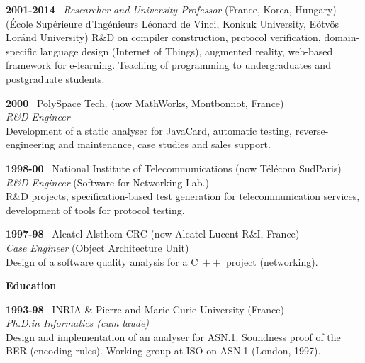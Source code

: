 \documentclass[a4paper,11pt]{article}
\newcommand{\cpp}{\mbox{C \hspace*{-2.5mm} \raise 0.7mm \hbox{${\scriptscriptstyle ++}$}}}
\begin{document}
\bigskip

\noindent\textbf{2001-2014} \ \textsf{\emph{Researcher and University
    Professor}} (France, Korea, Hungary)\\ (\textsf{\'Ecole
  Sup\'erieure d'Ing\'enieurs L\'eonard de Vinci}, \textsf{Konkuk
  University}, \textsf{E\"otv\"os Lor\'and University}) R\&D on
compiler construction, protocol verification, domain-specific language
design (Internet of Things), augmented reality, web-based framework
for e-learning. Teaching of programming to undergraduates and
postgraduate students.

\bigskip

\noindent\textbf{2000} \ \textsf{PolySpace Tech.\@} (now MathWorks,
Montbonnot, France)\\ \emph{R\&D Engineer}\\ Development of a static
analyser for JavaCard, automatic testing, reverse\hyp{}engineering and
maintenance, case studies and sales support.

\bigskip

\noindent\textbf{1998-00} \ \textsf{National Institute of
  Telecommunications} (now T\'el\'ecom SudParis)\\ \emph{R\&D
  Engineer} (Software for Networking Lab.)\\ R\&D projects,
specification-based test generation for telecommunication services,
development of tools for protocol testing.

\bigskip

\noindent\textbf{1997-98} \ \textsf{Alcatel-Alsthom CRC} (now
Alcatel-Lucent R\&I, France)\\ \emph{Case Engineer} (Object
Architecture Unit)\\ Design of a software quality analysis for a
\cpp{} project (networking).

\bigskip
\noindent\textbf{\large Education}
\bigskip

\noindent\textbf{1993-98} \ \textsf{INRIA \& Pierre and Marie Curie
  University} (France)\\ \emph{Ph.D.\@ in Informatics (cum
  laude)}\\ Design and implementation of an analyser for
ASN.1. Soundness proof of the BER (encoding rules). Working group at
ISO on ASN.1 (London, 1997).
\end{document}
